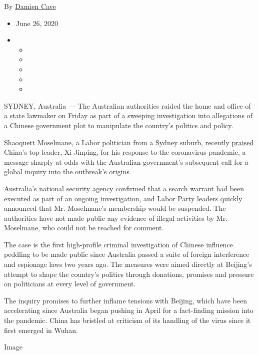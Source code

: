By \href{https://www.nytimes3xbfgragh.onion/by/damien-cave}{Damien Cave}

\begin{itemize}
\item
  June 26, 2020
\item
  \begin{itemize}
  \item
  \item
  \item
  \item
  \item
  \end{itemize}
\end{itemize}

SYDNEY, Australia --- The Australian authorities raided the home and
office of a state lawmaker on Friday as part of a sweeping investigation
into allegations of a Chinese government plot to manipulate the
country's politics and policy.

Shaoquett Moselmane, a Labor politician from a Sydney suburb, recently
\href{https://www.smh.com.au/politics/nsw/unswerving-leadership-nsw-labor-mp-praises-china-s-coronavirus-response-20200330-p54fbg.html}{praised}
China's top leader, Xi Jinping, for his response to the coronavirus
pandemic, a message sharply at odds with the Australian government's
subsequent call for a global inquiry into the outbreak's origins.

Australia's national security agency confirmed that a search warrant had
been executed as part of an ongoing investigation, and Labor Party
leaders quickly announced that Mr. Moselmane's membership would be
suspended. The authorities have not made public any evidence of illegal
activities by Mr. Moselmane, who could not be reached for comment.

The case is the first high-profile criminal investigation of Chinese
influence peddling to be made public since Australia passed a suite of
foreign interference and espionage laws two years ago. The measures were
aimed directly at Beijing's attempt to shape the country's politics
through donations, promises and pressure on politicians at every level
of government.

The inquiry promises to further inflame tensions with Beijing, which
have been accelerating since Australia began pushing in April for a
fact-finding mission into the pandemic. China has bristled at criticism
of its handling of the virus since it first emerged in Wuhan.

Image

